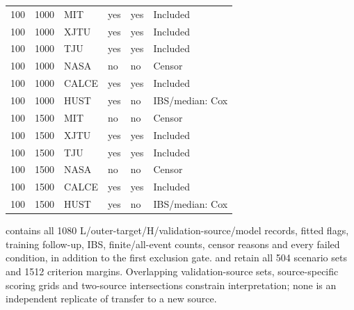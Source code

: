 \documentclass[10pt,a4paper]{article}
\begin{document}
{\begin{longtable}{@{\extracolsep{\fill}}llllll}
100 & 1000 & MIT & yes & yes & Included\\
100 & 1000 & XJTU & yes & yes & Included\\
100 & 1000 & TJU & yes & yes & Included\\
100 & 1000 & NASA & no & no & Censor\\
100 & 1000 & CALCE & yes & yes & Included\\
100 & 1000 & HUST & yes & no & IBS/median: Cox\\
100 & 1500 & MIT & no & no & Censor\\
100 & 1500 & XJTU & yes & yes & Included\\
100 & 1500 & TJU & yes & yes & Included\\
100 & 1500 & NASA & no & no & Censor\\
100 & 1500 & CALCE & yes & yes & Included\\
100 & 1500 & HUST & yes & no & IBS/median: Cox\\
\end{longtable}}
 contains all 1080 L/outer-target/H/validation-source/model records, fitted flags, training follow-up, IBS, finite/all-event counts, censor reasons and every failed condition, in addition to the first exclusion gate.  and  retain all 504 scenario sets and 1512 criterion margins. Overlapping validation-source sets, source-specific scoring grids and two-source intersections constrain interpretation; none is an independent replicate of transfer to a new source.
\end{document}
